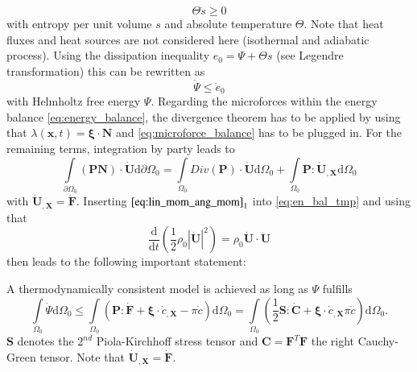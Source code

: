 \begin{equation}
	\Theta\dot{s}\geq0
\end{equation}
with entropy per unit volume $s$ and absolute temperature $\Theta$. Note that heat fluxes and heat sources are not considered here (isothermal and adiabatic process). Using the dissipation inequality $e_{0}=\Psi+\Theta  s$ (see Legendre transformation) this can be rewritten as
\begin{equation} \label{eq:entropy_balance}
	\dot{\Psi}\leq\dot{e}_{0}
\end{equation}
with Helmholtz free energy $\Psi$. Regarding the microforces within the energy balance \eqref{eq:energy_balance}, the divergence theorem has to be applied by using that $\lambda\left(\mathbf{x},t\right)=\bm{\xi}\cdot\mathbf{N}$ and \eqref{eq:microforce_balance} has to be plugged in. For the remaining terms, integration by party leads to 
\begin{equation} \label{eq:en_bal_tmp}
	\int\limits_{\partial\Omega_{0}}\left(\mathbf{P}\mathbf{N}\right)\cdot\dot{\mathbf{U}}\mathrm{d}\partial\Omega_{0}=\int\limits_{\Omega_{0}}Div\left(\mathbf{P}\right)\cdot\dot{\mathbf{U}}\mathrm{d}\Omega_{0}+\int\limits_{\Omega_{0}}\mathbf{P}:\dot{\mathbf{U}}_{,\mathbf{X}}\mathrm{d}\Omega_{0}
\end{equation}
with $\dot{\mathbf{U}}_{,\mathbf{X}}=\dot{\mathbf{F}}$. Inserting $\eqref{eq:lin_mom_ang_mom}_{1}$ into \eqref{eq:en_bal_tmp} and using that
\begin{equation}
	\dfrac{\mathrm{d}}{\mathrm{d}t}\left(\dfrac{1}{2}\rho_{0}|\dot{\mathbf{U}}|^{2}\right) = \rho_{0}\dot{\mathbf{U}}\cdot\ddot{\mathbf{U}}
\end{equation}
then leads to the following important statement:

A thermodynamically consistent model is achieved as long as $\Psi$ fulfills
\begin{equation} \label{eq:thermodyn_cons}
		\int\limits_{\Omega_{0}}\dot{\Psi}\mathrm{d}\Omega_{0} \leq \int\limits_{\Omega_{0}}\left(\mathbf{P}:\dot{\mathbf{F}}+\bm{\xi}\cdot\dot{c}_{,\mathbf{X}}-\pi\dot{c}\right)\mathrm{d}\Omega_{0} = \int\limits_{\Omega_{0}}\left(\dfrac{1}{2}\mathbf{S}:\dot{\mathbf{C}}+\bm{\xi}\cdot\dot{c}_{,\mathbf{X}}\pi\dot{c}\right)\mathrm{d}\Omega_{0}.
\end{equation}
$\mathbf{S}$ denotes the $2^{nd}$ Piola-Kirchhoff stress tensor and $\mathbf{C}=\mathbf{F}^{T}\mathbf{F}$ the right Cauchy-Green tensor. Note that $\dot{\mathbf{U}}_{,\mathbf{X}}=\dot{\mathbf{F}}$.

